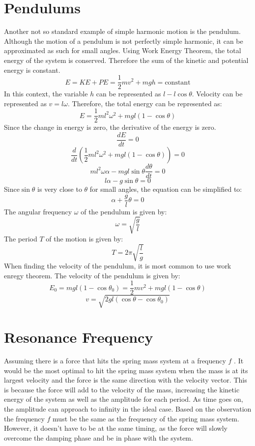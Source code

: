 \documentclass[11pt]{article}
\begin{document}
\section{Pendulums}
    Another not so standard example of simple harmonic motion is the
    pendulum. Although the motion of a pendulum is not perfectly simple harmonic,
    it can be approximated as such for small angles.
    Using Work Energy Theorem, the total energy of the system is conserved.
    Therefore the sum of the kinetic and potential energy is constant.
    \[E = KE + PE = \frac{1}{2} m v^2 + mgh = \text{constant}\]
    In this context, the variable $h$ can be represented as $l - l\cos\theta$.
    Velocity can be represented as $v = l\omega$.
    Therefore, the total energy can be represented as:
    \[E = \frac{1}{2} m l^2 \omega^2 + mgl(1 - \cos\theta)\]
    Since the change in energy is zero, the derivative of the energy is zero.
    \[\frac{dE}{dt} = 0\]
    \[\frac{d}{dt} \left(\frac{1}{2} m l^2 \omega^2 + mgl(1 - \cos\theta)\right) = 0\]
    \[m l^2 \omega \alpha - mgl\sin\theta \frac{d\theta}{dt} = 0\]
    \[l \alpha - g\sin\theta = 0\]
    Since$\sin \theta$ is very close to $\theta$ for small angles, the equation can be simplified to:
    \[\alpha + \frac{g}{l} \theta = 0\]
    The angular frequency $\omega$ of the pendulum is given by:
    \[\omega = \sqrt{\frac{g}{l}}\]
    The period $T$ of the motion is given by:
    \[T = 2\pi\sqrt{\frac{l}{g}}\]
    When finding the velocity of the pendulum, it is most common to use work
    enregy theorem. The velocity of the pendulum is given by:
    \[E_0 = mgl(1-\cos \theta _0) =  \frac{1}{2} m v^2 + mgl(1 - \cos\theta)\]
    \[v = \sqrt{2gl( \cos\theta -\cos \theta_0 )}\]

\section{Resonance Frequency}
Assuming there is a force that hits the spring mass system at a frequency $f$
. It would be the most optimal to hit the spring mass system when the mass
is at its largest velocity and the force is the same direction with the
velocity vector. This is because the force will add to the velocity of the
mass, increasing the kinetic energy of the system as well as the amplitude
for each period. As time goes on, the amplitude can approach to infinity in
the ideal case. Based on the observation the
frequency $f$ must be the same as the frequency of the spring mass system.
However, it doesn't have to be at the same timing, as the force will slowly
overcome the damping phase and be in phase with the system.
\end{document}
